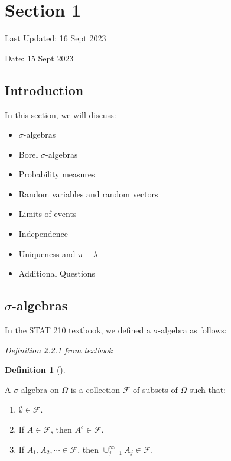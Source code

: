 \documentclass[
  letterpaper,
  DIV=11,
  numbers=noendperiod]{scrreprt}
\providecommand{\tightlist}{%
  \setlength{\itemsep}{0pt}\setlength{\parskip}{0pt}}\usepackage{longtable,booktabs,array}
\theoremstyle{definition}
\newtheorem{definition}{Definition}[chapter]
\theoremstyle{plain}
\theoremstyle{remark}
\begin{document}

\hypertarget{section-1}{%
\chapter*{Section 1}\label{section-1}}


Last Updated: 16 Sept 2023

Date: 15 Sept 2023

\hypertarget{introduction}{%
\section*{Introduction}\label{introduction}}


In this section, we will discuss:

\begin{itemize}
\tightlist
\item
  \(\sigma\)-algebras
\item
  Borel \(\sigma\)-algebras
\item
  Probability measures
\item
  Random variables and random vectors
\item
  Limits of events
\item
  Independence
\item
  Uniqueness and \(\pi-\lambda\)
\item
  Additional Questions
\end{itemize}

\hypertarget{sigma-algebras}{%
\section*{\texorpdfstring{\(\sigma\)-algebras}{\textbackslash sigma-algebras}}\label{sigma-algebras}}


In the STAT 210 textbook, we defined a \(\sigma\)-algebra as follows:

\emph{Definition 2.2.1 from textbook}

\leavevmode{}%
\begin{definition}[]\label{def-sigma-algebra}

A \(\sigma\)-algebra on \(\Omega\) is a collection \(\mathcal{F}\) of
subsets of \(\Omega\) such that:

\begin{enumerate}
\def\labelenumi{\arabic{enumi}.}
\item
  \(\emptyset \in \mathcal{F}\).
\item
  If \(A \in \mathcal{F}\), then \(A^c \in \mathcal{F}\).
\item
  If \(A_1, A_2, \cdots \in \mathcal{F}\), then
  \(\cup_{j=1}^{\infty} A_j \in \mathcal{F}\).
\end{enumerate}

\end{definition}
\end{document}
